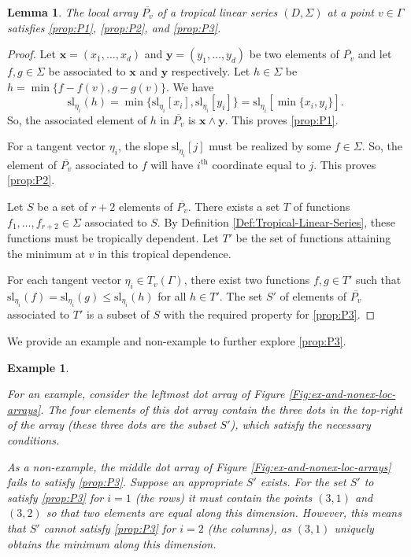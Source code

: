 \documentclass{amsart}
\newtheorem{lemma}[theorem]{Lemma}
\newtheorem{varexample}[theorem]{Example}
\newenvironment{example}{\begin{varexample}
		\begin{normalfont}}{\end{normalfont}
\end{varexample}}
\begin{document}
	\begin{lemma}
		\label{Lem:tls-local-arrays}
		The local array $\overline{P_v}$ of a tropical linear series $(D,\Sigma)$ at a point $v \in \Gamma$ satisfies \ref{prop:P1}, \ref{prop:P2}, and \ref{prop:P3}.
	\end{lemma}
	
	\begin{proof}
		Let $\mathbf{x} = (x_1, \ldots, x_d)$ and $\mathbf{y} = (y_1, \ldots, y_d)$ be two elements of $\overline{P_v}$ and let $f, g \in \Sigma$ be associated to $\mathbf{x}$ and $\mathbf{y}$ respectively. Let $h \in \Sigma$ be $h = \min \{ f - f(v), g - g(v) \}$. We have $$\mathrm{sl}_{\eta_i}(h) = \min \{ \mathrm{sl}_{\eta_i}[x_i], \mathrm{sl}_{\eta_i}[y_i] \} = \mathrm{sl}_{\eta_i}[\min \{ x_i,y_i \}].$$ So, the associated element of $h$ in $\overline{P_v}$ is $\mathbf{x} \wedge \mathbf{y}$. This proves \ref{prop:P1}.
		
		For a tangent vector $\eta_i$, the slope $\mathrm{sl}_{\eta_i}[j]$ must be realized by some $f \in \Sigma$. So, the element of $\overline{P_v}$ associated to $f$ will have $i^{\text{th}}$ coordinate equal to $j$. This proves \ref{prop:P2}.
		
		Let $S$ be a set of $r+2$ elements of $\overline{P_v}$. There exists a set $T$ of functions $f_1, \ldots, f_{r+2} \in \Sigma$ associated to $S$. By Definition \ref{Def:Tropical-Linear-Series}, these functions must be tropically dependent. Let $T'$ be the set of functions attaining the minimum at $v$ in this tropical dependence.
		
		For each tangent vector $\eta_i \in T_v(\Gamma)$, there exist two functions $f,g \in T'$ such that $\mathrm{sl}_{\eta_i}(f) = \mathrm{sl}_{\eta_i}(g) \leq \mathrm{sl}_{\eta_i}(h)$ for all $h \in T'$. The set $S'$ of elements of $\overline{P_v}$ associated to $T'$ is a subset of $S$ with the required property for \ref{prop:P3}.
	\end{proof}
	
	We provide an example and non-example to further explore \ref{prop:P3}.
	
	\begin{example}
		For an example, consider the leftmost dot array of Figure \ref{Fig:ex-and-nonex-loc-arrays}. The four elements of this dot array contain the three dots in the top-right of the array (these three dots are the subset $S'$), which satisfy the necessary conditions. 
		
		As a non-example, the middle dot array of Figure \ref{Fig:ex-and-nonex-loc-arrays} fails to satisfy \ref{prop:P3}. Suppose an appropriate $S'$ exists. For the set $S'$ to satisfy \ref{prop:P3} for $i=1$ (the rows) it must contain the points $(3,1)$ and $(3,2)$ so that two elements are equal along this dimension. However, this means that $S'$ cannot satisfy \ref{prop:P3} for $i=2$ (the columns), as $(3,1)$ uniquely obtains the minimum along this dimension.
	\end{example}
	
\end{document}
